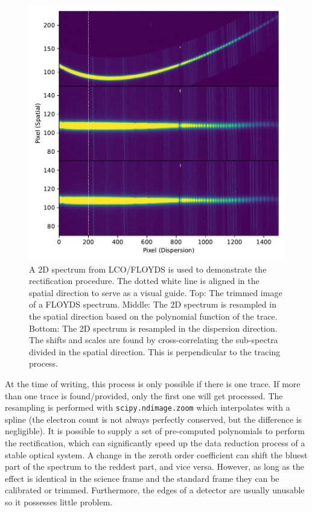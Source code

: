 \documentclass[twocolumn, linenumbers]{aastex631}
\begin{document}
\begin{figure}
    \centering
    \includegraphics[width=\columnwidth]{fig_02_rectification.pdf}
    \caption{A 2D spectrum from LCO/FLOYDS is used to
    demonstrate the rectification procedure. The dotted white line
    is aligned in the spatial direction to serve as a visual guide.
    Top: The trimmed image of a FLOYDS spectrum. Middle: The 2D
    spectrum is resampled in the spatial direction based on the
    polynomial function of the trace. Bottom: The 2D spectrum is
    resampled in the dispersion direction. The shifts and scales
    are found by cross-correlating the sub-spectra divided in the
    spatial direction. This is perpendicular to the tracing process.}
    \label{fig:rectify}
\end{figure}

At the time of writing, this process is only possible if there is
one trace. If more than one trace is found/provided, only the first
one will get processed. The resampling is performed with
\texttt{scipy.ndimage.zoom} which interpolates with a spline (the
electron count is not always perfectly conserved, but the difference
is negligible). It is possible to supply a set of pre-computed
polynomials to perform the rectification, which can significantly
speed up the data reduction process of a stable optical system.
A change in the zeroth order coefficient can shift the bluest part
of the spectrum to the reddest part, and vice versa. However, as long
as the effect is identical in the science frame and the standard frame
they can be calibrated or trimmed. Furthermore, the edges of
a detector are usually unusable so it possesses little problem.
\end{document}
